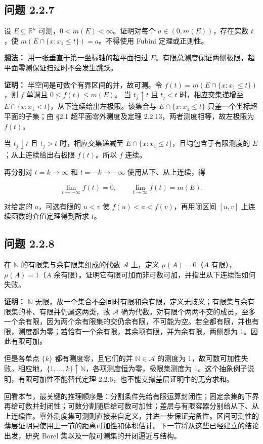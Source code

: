 \documentclass[11pt,a4paper]{article}
\begin{document}
\subsection{问题 2.2.7}\label{ux95eeux9898-2.2.7}

设 \(E\subseteq\mathbb R^n\) 可测，\(0<m(E)<\infty\)。证明对每个
\(a\in(0,m(E))\)，存在实数 \(t\)，使
\(m(E\cap\{x:x_1\le t\})=a\)。不得使用 Fubini 定理或正则性。

\textbf{想法：} 用一张垂直于第一坐标轴的超平面扫过
\(E\)。有限总测度保证两侧极限，超平面零测保证扫过时不会发生跳跃。

\textbf{证明：} 半空间是可数个有界区间的并，故可测。令
\(f(t)=m(E\cap\{x:x_1\le t\})\)，则 \(f\) 单调且 \(0\le f(t)\le m(E)\)。
当 \(t_j\uparrow t\) 且 \(t_j<t\) 时，相应交集递增至
\(E\cap\{x:x_1<t\}\)，从下连续给出左极限。该集合与
\(E\cap\{x:x_1\le t\}\) 只差一个坐标超平面的子集；由 §2.1
超平面零外测度及定理 2.2.13，两者测度相等，故左极限为 \(f(t)\)。

当 \(t_j\downarrow t\) 且 \(t_j>t\) 时，相应交集递减至
\(E\cap\{x:x_1\le t\}\)，且均包含于有限测度的 \(E\)；从上连续给出右极限
\(f(t)\)。所以 \(f\) 连续。

再分别对 \(t=k\to\infty\) 和 \(t=-k\to-\infty\) 使用从下、从上连续，得

\begin{equation*}
\lim_{t\to-\infty}f(t)=0,\qquad
\lim_{t\to\infty}f(t)=m(E).
\tag{2.2.22}
\end{equation*}

对给定的 \(a\)，可选有限的 \(u<v\) 使 \(f(u)<a<f(v)\)，再用闭区间
\([u,v]\) 上连续函数的介值定理得到所求 \(t\)。

\subsection{问题 2.2.8}\label{ux95eeux9898-2.2.8}

在 \(\mathbb N\) 的有限集与余有限集组成的代数 \(\mathcal A\) 上，定义
\(\mu(A)=0\)（\(A\) 有限），\(\mu(A)=1\)（\(A\)
余有限）。证明它有限可加而非可数可加，并指出从下连续性如何失败。

\textbf{证明：} \(\mathbb N\)
无限，故一个集合不会同时有限和余有限，定义无歧义；有限集与余有限集的补、有限并仍属这两类，故
\(\mathcal A\)
确为代数。对有限个两两不交的成员，至多一个余有限，因为两个余有限集的交仍余有限，不可能为空。若全都有限，并也有限，测度都为零；若恰有一个余有限，其余项有限，并为余有限，两侧都为
\(1\)。因此有限可加。

但是各单点 \(\{k\}\) 都有测度零，且它们的并 \(\mathbb N\in\mathcal A\)
的测度为
\(1\)，故可数可加性失败。相应地，\(\{1,\ldots,k\}\uparrow\mathbb N\)，各项测度恒为零，极限集测度为
\(1\)。这个抽象例子说明，有限可加性不能替代定理
2.2.6，也不能支撑差层证明中的无穷求和。

回看本节，最关键的推理顺序是：分割条件先给有限运算封闭性；固定余集的下界再给可数并封闭性；可数分割随后给可数可加性；差层与有限容器分别给从下、从上连续性。零外测度集可测则直接来自定义，并进一步保证完备性。区间可测性的薄层证明只使用上一节的距离可加性和体积估计。下一节将从这些已经建立的结论出发，研究
Borel 集以及一般可测集的开闭逼近与结构。
\end{document}
